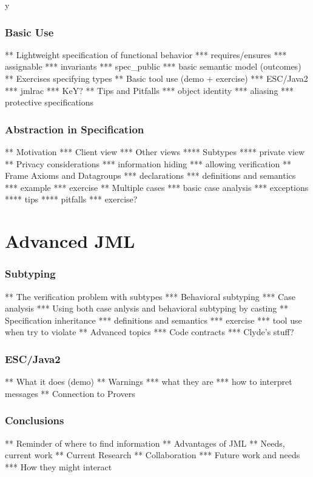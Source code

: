 \if y\MAKEHANDOUTS \documentclass[compress,landscape,handout]{beamer}
\begin{document}
\section[Basics]{Basic Use}
** Lightweight specification of functional behavior
*** requires/ensures
*** assignable
*** invariants
*** spec\_public
*** basic semantic model (outcomes)
** Exercises specifying types
** Basic tool use (demo + exercise)
*** ESC/Java2
*** jmlrac
*** KeY?
** Tips and Pitfalls
*** object identity
*** aliasing
*** protective specifications

\section[Abstraction]{Abstraction in Specification}

** Motivation
*** Client view
*** Other views
**** Subtypes
**** private view
** Privacy considerations
*** information hiding
*** allowing verification
** Frame Axioms and Datagroups
*** declarations
*** definitions and semantics
*** example
*** exercise
** Multiple cases
*** basic case analysis
*** exceptions
**** tips
**** pitfalls
*** exercise?

\part{Advanced JML}

\section{Subtyping}
** The verification problem with subtypes
*** Behavioral subtyping
*** Case analysis
*** Using both case anlysis and behavioral subtyping by casting
** Specification inheritance
*** definitions and semantics
*** exercise
*** tool use when try to violate
** Advanced topics
*** Code contracts
*** Clyde's stuff?

\section[ESC]{ESC/Java2}
** What it does (demo)
** Warnings
*** what they are
*** how to interpret messages
** Connection to Provers

\section*{Conclusions}

** Reminder of where to find information
** Advantages of JML
** Needs, current work
** Current Research
** Collaboration
*** Future work and needs
*** How they might interact
\end{document}
